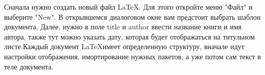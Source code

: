 \documentclass[a4paper,12pt]{article} %
\begin{document}
Сначала нужно создать новый файл \LaTeX . Для этого откройте меню "Файл" и выберите "New". В открывшемся диалоговом окне вам предстоит выбрать шаблон документа. Далее, нужно в поле title и author ввести название книги и имя автора, также тут можно указать дату, которая будет отображаться на титульном листе.Каждый документ \LaTeX  имеет определенную структуру, вначале идут настройки отображения, имортирование нужных пакетов, а уже потом сам текст в теле документа.
\end{document}
